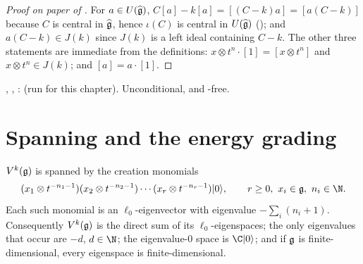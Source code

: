 \begin{proof}[Proof on paper of \allowbreak{}]
For $a\in U(\widehat{\mathfrak{g}})$, $C[a] - k[a] = [(C-k)a] = [a(C-k)]$ because $C$ is central in $\widehat{\mathfrak{g}}$,
hence $\iota(C)$ is central in $U(\widehat{\mathfrak{g}})$ (); and $a(C-k)\in J(k)$ since $J(k)$
is a left ideal containing $C-k$. The other three statements are immediate from the definitions:
$x\otimes t^n\cdot[1] = [x\otimes t^n]$ and $x\otimes t^n\in J(k)$; and $[a] = a\cdot[1]$.
\end{proof}

\begin{status}
\allowbreak{}\allowbreak{}\allowbreak{}\allowbreak{}, \allowbreak{}\allowbreak{}\allowbreak{}\allowbreak{},
\allowbreak{}\allowbreak{}\allowbreak{}:  (run for this
chapter). Unconditional, and -free.
\end{status}

\section{Spanning and the energy grading}\label{l02:sec:grading}

\begin{theorem}\label{l02:thm:span}
$V^k(\mathfrak{g})$ is spanned by the creation monomials
\begin{equation*}
 (x_1\otimes t^{-n_1-1})(x_2\otimes t^{-n_2-1})\cdots(x_r\otimes t^{-n_r-1})\ltwovac,\qquad r\ge0,\ x_i\in\ltwog,\ n_i\in\N.
\end{equation*}
Each such monomial is an $\ell_0$-eigenvector with eigenvalue $-\sum_i(n_i+1)$. Consequently
$V^k(\mathfrak{g})$ is the direct sum of its $\ell_0$-eigenspaces; the only eigenvalues that occur are
$-d$, $d\in\N$; the eigenvalue-$0$ space is $\C\ltwovac$; and if $\mathfrak{g}$ is finite-dimensional, every
eigenspace is finite-dimensional.
\end{theorem}

